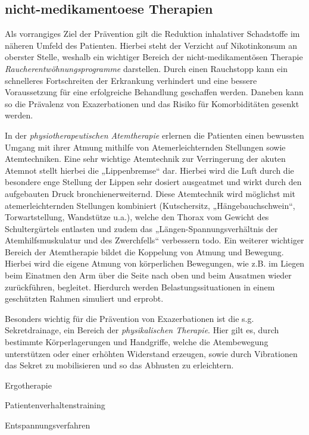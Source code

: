 \subsection{nicht-medikamentoese Therapien}
\label{nicht-medikamentoese therapien}
Als vorrangiges Ziel der Prävention gilt die Reduktion inhalativer Schadstoffe im näheren Umfeld des Patienten. Hierbei steht der Verzicht auf Nikotinkonsum an oberster Stelle, weshalb ein wichtiger Bereich der nicht-medikamentösen Therapie \emph{Raucherentwöhnungsprogramme} darstellen. Durch einen Rauchstopp kann ein schnelleres Fortschreiten der Erkrankung verhindert und eine bessere Voraussetzung für eine erfolgreiche Behandlung geschaffen werden. Daneben kann so die Prävalenz von Exazerbationen und das Risiko für Komorbiditäten gesenkt werden.

In der \emph{physiotherapeutischen Atemtherapie} erlernen die Patienten einen bewussten Umgang mit ihrer Atmung mithilfe von Atemerleichternden Stellungen sowie Atemtechniken. Eine sehr wichtige Atemtechnik zur Verringerung der akuten Atemnot stellt hierbei die „Lippenbremse“ dar. Hierbei wird die Luft durch die besondere enge Stellung der Lippen sehr dosiert ausgeatmet und wirkt durch den aufgebauten Druck bronchienerweiternd. Diese Atemtechnik wird möglichst mit atemerleichternden Stellungen kombiniert (Kutschersitz, „Hängebauchschwein“, Torwartstellung, Wandstütze u.a.), welche den Thorax vom Gewicht des Schultergürtels entlasten und zudem das „Längen-Spannungsverhältnis der Atemhilfsmuskulatur und des Zwerchfells“ verbessern \autocite[vgl.][291]{lang2007} todo. Ein weiterer wichtiger Bereich der Atemtherapie bildet die Koppelung von Atmung und Bewegung. Hierbei wird die eigene Atmung von körperlichen Bewegungen, wie z.B. im Liegen beim Einatmen den Arm über die Seite nach oben und beim Ausatmen wieder zurückführen, begleitet. Hierdurch werden Belastungssituationen in einem geschützten Rahmen simuliert und erprobt.

Besonders wichtig für die Prävention von Exazerbationen ist die s.g. Sekretdrainage, ein Bereich der \emph{physikalischen Therapie}. Hier gilt es, durch bestimmte Körperlagerungen und Handgriffe, welche die Atembewegung unterstützen oder einer erhöhten Widerstand erzeugen, sowie durch Vibrationen das Sekret zu mobilisieren und so das Abhusten zu erleichtern. 

Ergotherapie

Patientenverhaltenstraining

Entspannungsverfahren


